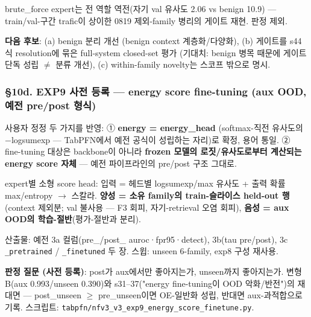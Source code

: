 \par\noindent \textbullet\enspace brute\_\allowbreak{}force expert는 전 역할 역전(자기 val 유사도 2.06 vs benign 10.9) — train/\allowbreak{}val-구간 trafic이 상이한 0819 제외-family 병리의 게이트 재현. 판정 제외.


\textbf{다음 후보}: (a) benign 분리 개선 (benign context 계층화/\allowbreak{}다양화), (b) 게이트를 s44식 resolution에 묶은 full-system closed-set 평가 (기대치: benign 병목 때문에 게이트 단독 성립 \ensuremath{\neq} 분류 개선), (c) within-family novelty는 스코프 밖으로 명시.

\subsubsection{§10d. EXP9 사전 등록 — energy score fine-tuning (aux OOD, 예전 pre/\allowbreak{}post 형식)}
사용자 정정 두 가지를 반영: ① \textbf{energy =\allowbreak{} energy\_\allowbreak{}head} (softmax-직전 유사도의 −logsumexp — TabPFN에서 예전 공식이 성립하는 자리)로 확정, 용어 통일. ② fine-tuning 대상은 backbone이 아니라 \textbf{frozen 모델의 로짓/\allowbreak{}유사도로부터 계산되는 energy score 자체} — 예전 파이프라인의 pre/\allowbreak{}post 구조 그대로.

\par\noindent \textbullet\enspace expert별 소형 score head: 입력 =\allowbreak{} 헤드별 logsumexp/\allowbreak{}max 유사도 +\allowbreak{} 출력 확률 max/\allowbreak{}entropy  \ensuremath{\rightarrow}  스칼라. \textbf{양성 =\allowbreak{} 소유 family의 train-슬라이스 held-out 행}(context 제외분; val 불사용 — F3 회피, 자기-retrieval 오염 회피), \textbf{음성 =\allowbreak{} aux OOD의 학습-절반}(평가-절반과 분리).


\par\noindent \textbullet\enspace 산출물: 예전 3a 컬럼(pre\_\allowbreak{}/\allowbreak{}post\_\allowbreak{} auroc·fpr95·detect), 3b(tau pre/\allowbreak{}post), 3c \texttt{\_\allowbreak{}\allowbreak{}pretrai\allowbreak{}ned} /\allowbreak{} \texttt{\_\allowbreak{}\allowbreak{}finetun\allowbreak{}ed} 두 장. 스윕: unseen 6-family, exp8 구성 재사용.


\par\noindent \textbullet\enspace \textbf{판정 질문 (사전 등록)}: post가 aux에서만 좋아지는가, unseen까지 좋아지는가. 변형 B(aux 0.993/\allowbreak{}unseen 0.390)와 s31–37("energy fine-tuning이 OOD 악화/\allowbreak{}반전")의 재대면 — post\_\allowbreak{}unseen \ensuremath{\geq} pre\_\allowbreak{}unseen이면 OE-일반화 성립, 반대면 aux-과적합으로 기록. 스크립트: \texttt{tabpfn/\allowbreak{}\allowbreak{}n\allowbreak{}fv3\_\allowbreak{}\allowbreak{}v3\_\allowbreak{}\allowbreak{}e\allowbreak{}xp9\_\allowbreak{}\allowbreak{}ener\allowbreak{}gy\_\allowbreak{}\allowbreak{}score\allowbreak{}\_\allowbreak{}\allowbreak{}finetun\allowbreak{}e.\allowbreak{}py}.


